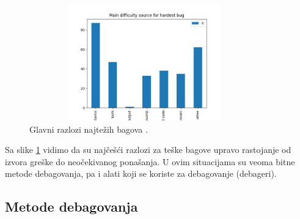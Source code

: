 \documentclass[a4paper]{article}
\begin{document}
\begin{figure}[h!]
	\begin{center}
		\includegraphics[width=100mm,height=50mm]{Slike/bagovi.png}
	\end{center}
	\caption{Glavni razlozi najtežih bagova \cite{study_bugs}.}
	\label{fig:bagovi}
\end{figure}

Sa slike \ref{fig:bagovi} vidimo da su najčešći razlozi za teške bagove upravo rastojanje od izvora greške do neočekivanog ponašanja. U ovim situacijama su veoma bitne metode debagovanja, pa i alati koji se koriste za debagovanje (debageri).

\subsection{Metode debagovanja}
\label{subsec:podnaslov2}
\end{document}
